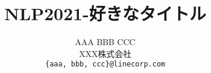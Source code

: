 \documentclass[
  platex, dvipdfmx,  %
]{nlp2021}
\title{NLP2021-好きなタイトル}
\author{
AAA \quad\quad BBB \quad\quad CCC\\
XXX株式会社 \\
\texttt{ \{aaa, bbb, ccc\}@linecorp.com }
}
\begin{document}
\maketitle














\clearpage
\appendix
\onecolumn %


\end{document}

